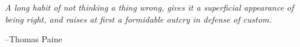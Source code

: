 \documentclass{exam}
\begin{document}
\else

\vspace{10 cm}


{\em A long habit of not thinking a thing wrong, gives it a superficial appearance of being right, and raises at first a
  formidable outcry in defense of custom.}

\vspace{.2 cm}

\hspace{1 cm} --Thomas Paine

\fi
\end{document}
